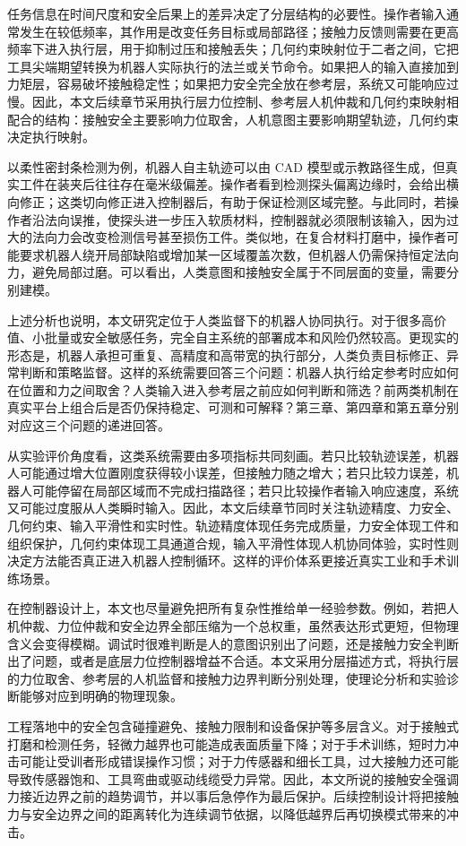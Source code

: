 任务信息在时间尺度和安全后果上的差异决定了分层结构的必要性。操作者输入通常发生在较低频率，其作用是改变任务目标或局部路径；接触力反馈则需要在更高频率下进入执行层，用于抑制过压和接触丢失；几何约束映射位于二者之间，它把工具尖端期望转换为机器人实际执行的法兰或关节命令。如果把人的输入直接加到力矩层，容易破坏接触稳定性；如果把力安全完全放在参考层，系统又可能响应过慢。因此，本文后续章节采用执行层力位控制、参考层人机仲裁和几何约束映射相配合的结构：接触安全主要影响力位取舍，人机意图主要影响期望轨迹，几何约束决定执行映射。

以柔性密封条检测为例，机器人自主轨迹可以由 CAD 模型或示教路径生成，但真实工件在装夹后往往存在毫米级偏差。操作者看到检测探头偏离边缘时，会给出横向修正；这类切向修正进入控制器后，有助于保证检测区域完整。与此同时，若操作者沿法向误推，使探头进一步压入软质材料，控制器就必须限制该输入，因为过大的法向力会改变检测信号甚至损伤工件。类似地，在复合材料打磨中，操作者可能要求机器人绕开局部缺陷或增加某一区域覆盖次数，但机器人仍需保持恒定法向力，避免局部过磨。可以看出，人类意图和接触安全属于不同层面的变量，需要分别建模。

上述分析也说明，本文研究定位于人类监督下的机器人协同执行。对于很多高价值、小批量或安全敏感任务，完全自主系统的部署成本和风险仍然较高。更现实的形态是，机器人承担可重复、高精度和高带宽的执行部分，人类负责目标修正、异常判断和策略监督。这样的系统需要回答三个问题：机器人执行给定参考时应如何在位置和力之间取舍？人类输入进入参考层之前应如何判断和筛选？前两类机制在真实平台上组合后是否仍保持稳定、可测和可解释？第三章、第四章和第五章分别对应这三个问题的递进回答。

从实验评价角度看，这类系统需要由多项指标共同刻画。若只比较轨迹误差，机器人可能通过增大位置刚度获得较小误差，但接触力随之增大；若只比较力误差，机器人可能停留在局部区域而不完成扫描路径；若只比较操作者输入响应速度，系统又可能过度服从人类瞬时输入。因此，本文后续章节同时关注轨迹精度、力安全、几何约束、输入平滑性和实时性。轨迹精度体现任务完成质量，力安全体现工件和组织保护，几何约束体现工具通道合规，输入平滑性体现人机协同体验，实时性则决定方法能否真正进入机器人控制循环。这样的评价体系更接近真实工业和手术训练场景。

在控制器设计上，本文也尽量避免把所有复杂性推给单一经验参数。例如，若把人机仲裁、力位仲裁和安全边界全部压缩为一个总权重，虽然表达形式更短，但物理含义会变得模糊。调试时很难判断是人的意图识别出了问题，还是接触力安全判断出了问题，或者是底层力位控制器增益不合适。本文采用分层描述方式，将执行层的力位取舍、参考层的人机监督和接触力边界判断分别处理，使理论分析和实验诊断能够对应到明确的物理现象。

工程落地中的安全包含碰撞避免、接触力限制和设备保护等多层含义。对于接触式打磨和检测任务，轻微力越界也可能造成表面质量下降；对于手术训练，短时力冲击可能让受训者形成错误操作习惯；对于力传感器和细长工具，过大接触力还可能导致传感器饱和、工具弯曲或驱动线缆受力异常。因此，本文所说的接触安全强调力接近边界之前的趋势调节，并以事后急停作为最后保护。后续控制设计将把接触力与安全边界之间的距离转化为连续调节依据，以降低越界后再切换模式带来的冲击。




